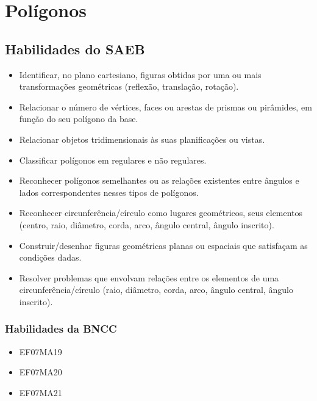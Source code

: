 \chapter{Polígonos}

\section{Habilidades do SAEB}
\begin{itemize}
\item Identificar, no plano cartesiano, figuras obtidas
por uma ou mais transformações geométricas (reflexão, translação,
rotação).
\item
  Relacionar o número de vértices, faces ou arestas de prismas ou
  pirâmides, em função do seu polígono da base.
\item
  Relacionar objetos tridimensionais às suas planificações ou vistas.
\item
  Classificar polígonos em regulares e não regulares.
\item
  Reconhecer polígonos semelhantes ou as relações existentes entre
  ângulos e lados correspondentes nesses tipos de polígonos.
\item
  Reconhecer circunferência/círculo como lugares geométricos, seus
  elementos (centro, raio, diâmetro, corda, arco, ângulo central, ângulo
  inscrito).
\item
  Construir/desenhar figuras geométricas planas ou espaciais que
  satisfaçam as condições dadas.
\item
  Resolver problemas que envolvam relações entre os elementos de uma
  circunferência/círculo (raio, diâmetro, corda, arco, ângulo central,
  ângulo inscrito).
\end{itemize}

\subsection{Habilidades da BNCC}
\begin{itemize}
\item EF07MA19
\item EF07MA20
\item EF07MA21
\end{itemize}


